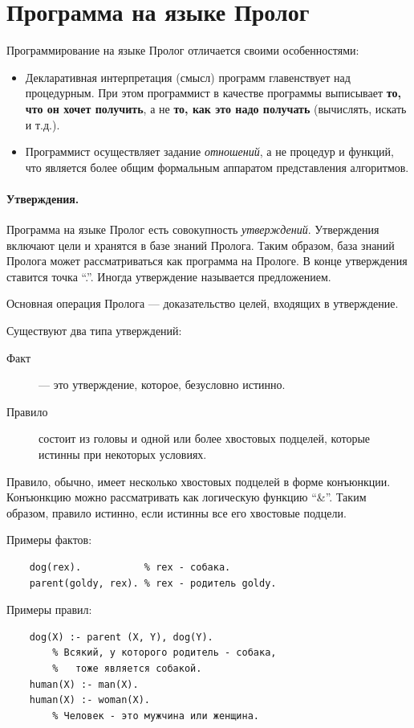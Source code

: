 \documentclass[12pt, openany, twoside]{book} %
\begin{document}
\section{Программа на языке Пролог}

Программирование на языке Пролог отличается своими особенностями:
\begin{itemize}
\item Декларативная интерпретация (смысл) программ главенствует над процедурным. При этом  программист в качестве программы выписывает {\bf то, что он хочет получить}, а не  {\bf то, как это надо получать} (вычислять, искать и т.д.).
\item Программист осуществляет задание \emph{отношений}, а не {процедур и функций}, что является более общим формальным аппаратом представления алгоритмов.
\end{itemize}

\paragraph{Утверждения.} Программа на языке Пролог есть совокупность \emph{утверждений}. Утверждения включают цели и хранятся в базе знаний Пролога. Таким образом, база знаний Пролога может рассматриваться как программа на Прологе. В конце утверждения ставится точка ``.''. Иногда утверждение называется предложением.

Основная операция Пролога --- доказательство целей, входящих в утверждение.

Существуют два типа утверждений:
\begin{description}
\item[Факт] --- это утверждение, которое, безусловно истинно.
\item[Правило] состоит из головы и одной или более хвостовых подцелей, которые истинны при некоторых условиях.
\end{description}

Правило, обычно, имеет несколько хвостовых подцелей в форме конъюнкции. Конъюнкцию можно рассматривать как логическую функцию ``\&''. Таким образом, правило истинно, если истинны все его хвостовые подцели.

Примеры фактов:
{\tt\begin{verbatim}
    dog(rex).           % rex - собака.
    parent(goldy, rex). % rex - родитель goldy.
\end{verbatim}}

Примеры правил:
{\tt\begin{verbatim}
    dog(X) :- parent (X, Y), dog(Y).
        % Всякий, у которого родитель - собака,
        %   тоже является собакой.
    human(Х) :- man(Х).
    human(Х) :- woman(Х).
        % Человек - это мужчина или женщина.
\end{verbatim}}
\end{document}
